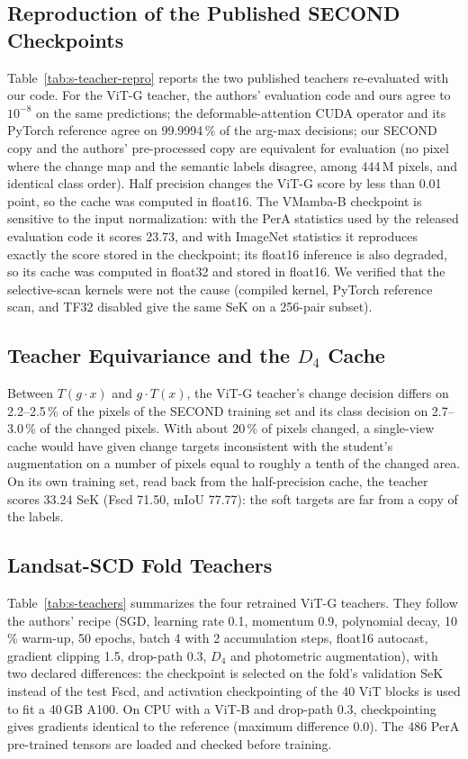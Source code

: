 \documentclass[journal,onecolumn,11pt]{IEEEtran}
\begin{document}
\subsection{Reproduction of the Published SECOND Checkpoints}
Table~\ref{tab:s-teacher-repro} reports the two published teachers re-evaluated with our code.
For the ViT-G teacher, the authors' evaluation code and ours agree to $10^{-8}$ on the same
predictions; the deformable-attention CUDA operator and its PyTorch reference agree on
99.9994\,\% of the arg-max decisions; our SECOND copy and the authors' pre-processed copy are
equivalent for evaluation (no pixel where the change map and the semantic labels disagree, among
444\,M pixels, and identical class order). Half precision changes the ViT-G score by less than
0.01 point, so the cache was computed in float16. The VMamba-B checkpoint is sensitive to the
input normalization: with the PerA statistics used by the released evaluation code it scores
23.73, and with ImageNet statistics it reproduces exactly the score stored in the checkpoint;
its float16 inference is also degraded, so its cache was computed in float32 and stored in
float16. We verified that the selective-scan kernels were not the cause (compiled kernel,
PyTorch reference scan, and TF32 disabled give the same SeK on a 256-pair subset).



\subsection{Teacher Equivariance and the $D_4$ Cache}
Between $T(g\cdot x)$ and $g\cdot T(x)$, the ViT-G teacher's change decision differs on
2.2--2.5\,\% of the pixels of the SECOND training set and its class decision on 2.7--3.0\,\% of
the changed pixels. With about 20\,\% of pixels changed, a single-view cache would have given
change targets inconsistent with the student's augmentation on a number of pixels equal to roughly a
tenth of the changed area.
On its own training set, read back from the half-precision cache, the teacher scores 33.24 SeK
(Fscd 71.50, mIoU 77.77): the soft targets are far from a copy of the labels.

\subsection{Landsat-SCD Fold Teachers}
Table~\ref{tab:s-teachers} summarizes the four retrained ViT-G teachers. They follow the authors'
recipe (SGD, learning rate 0.1, momentum 0.9, polynomial decay, 10\,\% warm-up, 50 epochs, batch
4 with 2 accumulation steps, float16 autocast, gradient clipping 1.5, drop-path 0.3, $D_4$ and
photometric augmentation), with two declared differences: the checkpoint is selected on the fold's
validation SeK instead of the test Fscd, and activation checkpointing of the 40 ViT blocks is used
to fit a 40\,GB A100. On CPU with a ViT-B and drop-path 0.3, checkpointing gives gradients
identical to the reference (maximum difference 0.0). The 486 PerA pre-trained tensors are loaded
and checked before training.
\end{document}
